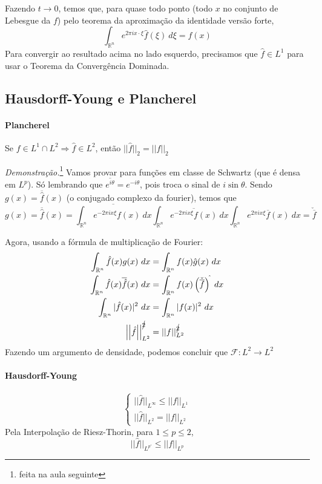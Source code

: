 \documentclass[11pt]{article}
\newcommand{\Rn}{{\mathbb{R}^n}}
\newcommand{\norm}[2]{\left|\left|#1\right|\right|_{L^{#2}}}
\begin{document}
Fazendo \(t \rightarrow 0\), temos que, para quase todo ponto (todo \(x\) no conjunto de Lebesgue da \(f\)) pelo teorema da aproximação da identidade versão forte, \[\int_\Rn e^{2\pi i x \cdot \xi}  \hat{f} (\xi)\ d \xi = f(x)\] Para convergir ao resultado acima no lado esquerdo, precisamos que \(\hat{f} \in L^1\) para usar o Teorema da Convergência Dominada.

\subsection{Hausdorff-Young e Plancherel}
\paragraph{Plancherel}
Se \( f \in L^1 \cap L^2 \Rightarrow \hat{f} \in L ^2 \), então \( || \hat{f} ||_2 = || f ||_2 \)

\textit{Demonstração.}\footnote{feita na aula seguinte} Vamos provar para funções em classe de Schwartz (que é densa em \(L^p\)). Só lembrando que \(\overline{e^{i\theta}} = e^{-i\theta}\), pois troca o sinal de \(i\sin\theta\). Sendo \(g(x)=\overline{\hat{f}}(x)\) (o conjugado complexo da fourier), temos que
\[g(x)=\overline{\hat{f}}(x) = \overline{\int_\Rn e^{-2\pi i x \xi} f(x)\ dx}  \int_\Rn \overline{e^{-2\pi i x \xi} f(x)}\ dx \int_\Rn e^{2\pi i x \xi} \overline{f}(x)\ dx = \check{\overline{f}}\]



Agora, usando a fórmula de multiplicação de Fourier: \begin{align*}
	\int_\Rn \hat{f}(x) g(x)\ dx &= \int_\Rn f(x) \hat{g}(x)\ dx \\
	\int_\Rn \hat{f}(x) \overline{\hat{f}}(x) \ dx &= \int_\Rn f(x) \left( \check{\overline{f}} \right)^{\hat{}}  \ dx\\
	\int_\Rn | \hat{f}(x) |^2\ dx &= \int_\Rn | f(x) |^2    \ dx\\
	\norm{\hat{f}}{2}^{\cancel{2}}&= \norm{f}{2}^{\cancel{2}}
\end{align*}
Fazendo um argumento de densidade, podemos concluir que \(\mathcal{F}: L^2 \rightarrow L^2\)

\paragraph{Hausdorff-Young}
\[\begin{cases}
	||\hat{f}||_{L^\infty} \leq \norm{f}{1} \\
	||\hat{f}||_{L^2} = \norm{f}{2}
\end{cases}\] Pela Interpolação de Riesz-Thorin, para \(1 \leq p \leq 2\), \[||\hat{f}||_{L^{p'}} \leq \norm{f}{p}\]
\end{document}
